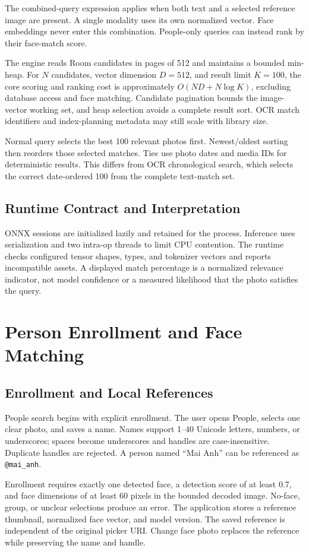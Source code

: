 \documentclass[11pt,a4paper]{article}
\newcommand{\code}[1]{{\small\texttt{#1}}}
\newcommand{\reportsection}[1]{\section{#1}}
\begin{document}
The combined-query expression applies when both text and a selected reference image are present. A single modality uses its own normalized vector. Face embeddings never enter this combination. People-only queries can instead rank by their face-match score.

The engine reads Room candidates in pages of 512 and maintains a bounded min-heap. For \(N\) candidates, vector dimension \(D=512\), and result limit \(K=100\), the core scoring and ranking cost is approximately \(O(ND+N\log K)\), excluding database access and face matching. Candidate pagination bounds the image-vector working set, and heap selection avoids a complete result sort. OCR match identifiers and index-planning metadata may still scale with library size.

Normal query selects the best 100 relevant photos first. Newest/oldest sorting then reorders those selected matches. Ties use photo dates and media IDs for deterministic results. This differs from OCR chronological search, which selects the correct date-ordered 100 from the complete text-match set.

\subsection{Runtime Contract and Interpretation}

ONNX sessions are initialized lazily and retained for the process. Inference uses serialization and two intra-op threads to limit CPU contention. The runtime checks configured tensor shapes, types, and tokenizer vectors and reports incompatible assets. A displayed match percentage is a normalized relevance indicator, not model confidence or a measured likelihood that the photo satisfies the query.


\reportsection{Person Enrollment and Face Matching}

\subsection{Enrollment and Local References}

People search begins with explicit enrollment. The user opens People, selects one clear photo, and saves a name. Names support 1–40 Unicode letters, numbers, or underscores; spaces become underscores and handles are case-insensitive. Duplicate handles are rejected. A person named “Mai Anh” can be referenced as \code{@mai\_anh}.

Enrollment requires exactly one detected face, a detection score of at least 0.7, and face dimensions of at least 60 pixels in the bounded decoded image. No-face, group, or unclear selections produce an error. The application stores a reference thumbnail, normalized face vector, and model version. The saved reference is independent of the original picker URI. Change face photo replaces the reference while preserving the name and handle.
\end{document}
